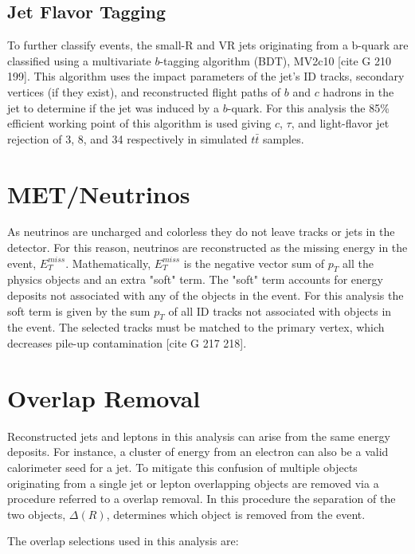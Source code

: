 \subsection{Jet Flavor Tagging}
\label{Jet Flavor Tagging}
To further classify events, the small-R and VR jets originating from a b-quark are classified using a multivariate $b$-tagging algorithm (BDT), MV2c10 [cite G 210 199]. This algorithm uses the impact parameters of the jet's ID tracks, secondary vertices (if they exist), and reconstructed flight paths of $b$ and $c$ hadrons in the jet to determine if the jet was induced by a $b$-quark. For this analysis the 85\% efficient working point of this algorithm is used giving $c$, $\tau$, and light-flavor jet rejection of 3, 8, and 34 respectively in simulated $t\bar{t}$ samples.

\section{MET/Neutrinos}
As neutrinos are uncharged and colorless they do not leave tracks or jets in the detector. For this reason, neutrinos are reconstructed as the missing energy in the event, $E_{T}^{miss}$. Mathematically, $E_{T}^{miss}$ is the negative vector sum of $p_{T}$ all the physics objects and an extra "soft" term. The "soft" term accounts for energy deposits not associated with any of the objects in the event. For this analysis the soft term is given by the sum $p_{T}$ of all ID tracks not associated with objects in the event. The selected tracks must be matched to the primary vertex, which decreases pile-up contamination [cite G 217 218]. 

\section{Overlap Removal}
Reconstructed jets and leptons in this analysis can arise from the same energy deposits. For instance, a cluster of energy from an electron can also be a valid calorimeter seed for a jet. To mitigate this confusion of multiple objects originating from a single jet or lepton overlapping objects are removed via a procedure referred to a overlap removal. In this procedure the separation of the two objects, $\Delta (R) $, determines which object is removed from the event. 

The overlap selections used in this analysis are:

